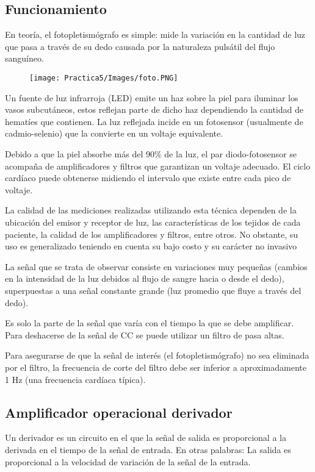 \documentclass[12pt]{article}
\begin{document}
        \subsection{Funcionamiento}
        En teoría, el fotopletismógrafo es simple: mide la variación en la cantidad de luz que pasa a través de su dedo causada por la naturaleza pulsátil del flujo sanguíneo.
        
        \begin{figure}[h!]
                \centering
                \texttt{[image: Practica5/Images/foto.PNG]}
            \end{figure}
        
        Un fuente de luz infrarroja (LED) emite un haz sobre la piel para iluminar los vasos subcutáneos, estos reflejan parte de dicho haz dependiendo la cantidad de hematíes que contienen. La luz reflejada incide en un fotosensor (usualmente de cadmio-selenio) que la convierte en un voltaje equivalente. 
        
        Debido a que la piel absorbe más del  $90\%$ de la luz, el par diodo-fotosensor se acompaña de amplificadores y filtros que garantizan un voltaje adecuado. El ciclo cardíaco puede obtenerse midiendo el intervalo que existe entre cada pico de voltaje.
            
        La calidad de las mediciones realizadas utilizando esta técnica dependen de la ubicación del emisor y receptor de luz, las características de los tejidos de cada paciente, la calidad de los amplificadores y filtros, entre otros. No obstante, su uso es generalizado teniendo en cuenta su bajo costo y su carácter no invasivo
        
        La señal que se trata de observar consiste en variaciones muy pequeñas (cambios en la intensidad de la luz debidos al flujo de sangre hacia o desde el dedo), superpuestas a una señal constante grande (luz promedio que fluye a través del dedo).  
        
        Es solo la parte de la señal que varía con el tiempo la que se debe amplificar. Para deshacerse de la señal de CC se puede utilizar un filtro de pasa altas.   
        
        Para asegurarse de que la señal de interés (el fotopletismógrafo) no sea eliminada por el filtro, la frecuencia de corte del filtro debe ser inferior a aproximadamente 1 Hz (una frecuencia cardíaca típica).
        
        \subsection{Amplificador operacional derivador}
        Un derivador es un circuito en el que la señal de salida es proporcional a la derivada en el tiempo de la señal de entrada. En otras palabras: La salida es proporcional a la velocidad de variación de la señal de la entrada.
        
\end{document}
